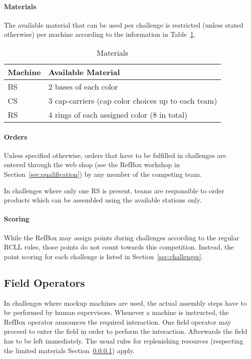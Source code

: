\documentclass[12pt,twoside]{article}
\newcommand{\refsec}[1]{Section~\ref{#1}}
\newcommand{\reftab}[1]{Table~\ref{#1}}
\begin{document}
\paragraph{Materials}\label{sec:materials}
The available material that can be used per challenge is restricted
(unless stated otherwise) per machine according to the information in
\reftab{tab:materials}.
\begin{table}[!htb]
 \centering
  \begin{tabularx}{\linewidth}{l|l}
   Machine & Available Material  \\\hline
   \ac{BS} & 2 bases of each color \\
   \ac{CS} & 3 cap-carriers (cap color choices up to each team)  \\
   \ac{RS} & 4 rings of each assigned color (8 in total)  \\
  \end{tabularx}
 \caption{Materials}
 \label{tab:materials}
\end{table}

\paragraph{Orders}
Unless specified otherwise, orders that have to be fulfilled in challenges
are entered through the web shop
(see the RefBox workshop in \refsec{sec:qualification})
by any member of the competing team.

In challenges where only one \ac{RS} is present, teams are responsible to
order products which can be assembled using the available stations only.

\paragraph{Scoring}\label{sec:scoring}
While the RefBox may assign points during challenges according to the
regular RCLL rules, those points do not count towards this competition.
Instead, the point scoring for each challenge is listed in
\refsec{sec:challenges}.

\subsection{Field Operators}\label{sec:operators}
In challenges where mockup machines are used, the actual assembly steps have
to be performed by human supervisors. Whenever a machine is instructed,
the RefBox operator announces the required interaction. One field operator may
proceed to enter the field in order to perform the interaction. Afterwards the
field has to be left immediately.
The usual rules for replenishing resources (respecting the limited materials
\refsec{sec:materials}) apply.
\end{document}
